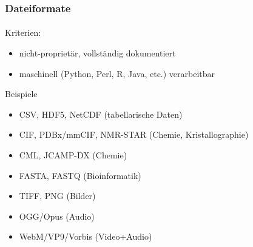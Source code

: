 \begin{frame}
    \frametitle{Dateiformate}
    \framesubtitle{}

    Kriterien:
    \begin{itemize}
        \item nicht-proprietär, vollständig dokumentiert
        \item maschinell (Python, Perl, R, Java, etc.) verarbeitbar
    \end{itemize}

    \begin{block}{Beispiele}
        \begin{itemize}
            \item CSV, HDF5, NetCDF (tabellarische Daten)
            \item CIF, PDBx/mmCIF, NMR-STAR (Chemie, Kristallographie)
            \item CML, JCAMP-DX (Chemie)    
            \item FASTA, FASTQ (Bioinformatik)
            \item TIFF, PNG (Bilder)
            \item OGG/Opus (Audio)
            \item WebM/VP9/Vorbis (Video+Audio)
        \end{itemize}
    \end{block}
\end{frame}
